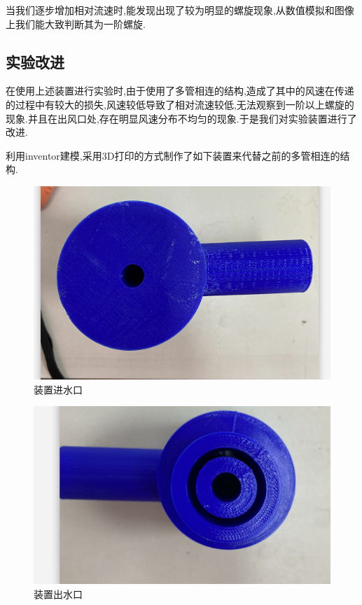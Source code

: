 \documentclass[UTF8]{gapd}
\begin{document}
当我们逐步增加相对流速时,能发现出现了较为明显的螺旋现象,从数值模拟和图像上我们能大致判断其为一阶螺旋.

\subsection{实验改进}

在使用上述装置进行实验时,由于使用了多管相连的结构,造成了其中的风速在传递的过程中有较大的损失,风速较低导致了相对流速较低,无法观察到一阶以上螺旋的现象.并且在出风口处,存在明显风速分布不均匀的现象.于是我们对实验装置进行了改进.

利用inventor建模,采用3D打印的方式制作了如下装置来代替之前的多管相连的结构.
\begin{figure}[H]
	\centering
	\includegraphics[width=0.8\linewidth]{images/蓝头1}
	\caption{装置进水口}
	\label{fig:P2}
\end{figure}
\begin{figure}[H]
	\centering
	\includegraphics[width=0.8\linewidth]{images/蓝头2}
	\caption{装置出水口}
	\label{fig:P2}
\end{figure}
\end{document}

